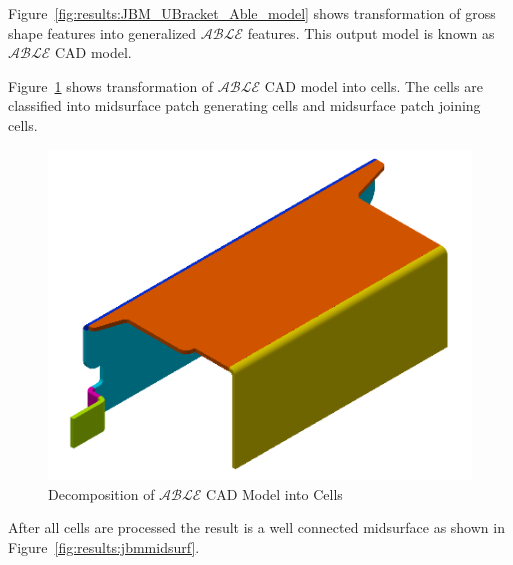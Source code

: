 \begin{minipage}{\linewidth}
\begin{minipage}[c]{0.3\linewidth}
 \label{fig:results:JBM_UBracket_Able_tree}
\end{minipage}
\end{minipage}


Figure~\ref{fig:results:JBM_UBracket_Able_model} shows transformation of gross shape features into generalized $\mathcal{ABLE}$ features. This output model is known as $\mathcal{ABLE}$ CAD model. 
%



Figure~\ref{fig:results:jbmdecomp} shows transformation of $\mathcal{ABLE}$ CAD model into cells. The cells are classified into midsurface patch generating cells and midsurface patch joining cells.


\begin{figure}[!h]
\centering     %
\includegraphics[width=0.62\linewidth,valign=t]{../Common/images/JBM_UBracket_decomp_model}
\caption{Decomposition of $\mathcal{ABLE}$ CAD Model into Cells}
\label{fig:results:jbmdecomp}
\end{figure}


After all cells are processed the result is a well connected midsurface as shown in Figure~\ref{fig:results:jbmmidsurf}.


